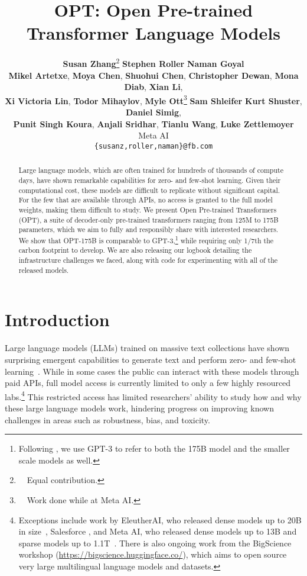 \documentclass[11pt]{article}
\title{OPT: Open Pre-trained Transformer Language Models}
\author{
{\bf Susan Zhang}\thanks{\ \ Equal contribution.
}\footnotemark[1]{\normalfont ,} 
{\bf Stephen Roller}\footnotemark[1]{\normalfont ,} 
{\bf Naman Goyal}\footnotemark[1]{\normalfont ,} 
\\
{\bf Mikel Artetxe}{\normalfont ,}
{\bf Moya Chen}{\normalfont ,}
{\bf Shuohui Chen}{\normalfont ,}
{\bf Christopher Dewan}{\normalfont ,}
{\bf Mona Diab}{\normalfont ,}
{\bf Xian Li}{\normalfont ,} \\
{\bf Xi Victoria Lin}{\normalfont ,}
{\bf Todor Mihaylov}{\normalfont ,}
{\bf Myle Ott}\thanks{\ \ Work done while at Meta AI.}\footnotemark[2]{\normalfont ,}
{\bf Sam Shleifer}\footnotemark[2]{\normalfont ,} 
{\bf Kurt Shuster}{\normalfont ,} 
{\bf Daniel Simig}{\normalfont ,} \\
{\bf Punit Singh Koura}{\normalfont ,}
{\bf Anjali Sridhar}{\normalfont ,}
{\bf Tianlu Wang}{\normalfont ,}
{\bf Luke Zettlemoyer}{\normalfont } \\
\tablewhitespace
Meta AI\\
\tablewhitespace
\texttt{\{susanz,roller,naman\}@fb.com}
}
\newcommand{\OPT}[0]{{OPT-175B}}
\newcommand{\biggpt}[1]{{GPT-3#1}}
\begin{document}
\maketitle
\begin{abstract}
Large language models, which are often trained for hundreds of thousands of compute days, have shown remarkable capabilities for zero- and few-shot learning. Given their computational cost, these models are difficult to replicate without significant capital.  For the few that are available through APIs, no access is granted to the full model weights, making them difficult to study. We present Open Pre-trained Transformers (OPT), a suite of decoder-only pre-trained transformers ranging from 125M to 175B parameters, which we aim to fully and responsibly share with interested researchers. We show that \OPT{} is comparable to \biggpt{},\footnote{Following \citet{brown2020gpt3}, we use \biggpt{} to  refer to both the 175B model and the smaller scale models as well.} while requiring only 1/7th the carbon footprint to develop.  We are also releasing our logbook detailing the infrastructure challenges we faced, along with code for experimenting with all of the released models.
\end{abstract}


\section{Introduction}

Large language models (LLMs) trained on massive text collections have shown surprising emergent capabilities to generate text and perform zero- and few-shot learning~\cite{brown2020gpt3,J1WhitePaper,megatron2022,gopher2022,palm2022}. While in some cases the public can interact with these models through paid APIs, full model access is currently limited to only a few highly resourced labs.\footnote{Exceptions include work by EleutherAI, who released dense models up to 20B in size~\cite{eleutherai2022}, Salesforce \cite{Nijkamp2022ACP}, and Meta AI, who released dense models up to 13B and sparse models up to 1.1T~\cite{1TMoE2021}. There is also ongoing work from the BigScience workshop (\url{https://bigscience.huggingface.co/}), which aims to open source very large multilingual language models and datasets.} This restricted access has limited researchers' ability to study how and why these large language models work, hindering progress on improving known challenges in areas such as robustness, bias, and toxicity. 
\end{document}
